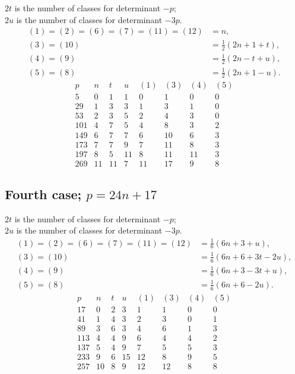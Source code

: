 \documentclass[12pt]{article}
\begin{document}
$2t$ is the number of classes for determinant $-p$;\\
$2u$ is the number of classes for determinant $-3p$.
\[
\begin{aligned}
(1)=(2)=(6)=(7)=(11)=(12)&=n,\\
(3)=(10)&=\frac12(2n+1+t),\\
(4)=(9)&=\frac12(2n-t+u),\\
(5)=(8)&=\frac12(2n+1-u).
\end{aligned}
\]
\[
\begin{array}{r|r|r|r|r|r|r|r}
p&n&t&u&(1)&(3)&(4)&(5)\\\hline
5&0&1&1&0&1&0&0\\
29&1&3&3&1&3&1&0\\
53&2&3&5&2&4&3&0\\
101&4&7&5&4&8&3&2\\
149&6&7&7&6&10&6&3\\
173&7&7&9&7&11&8&3\\
197&8&5&11&8&11&11&3\\
269&11&11&7&11&17&9&8
\end{array}
\]

\subsection*{Fourth case; \(p=24n+17\)}

$2t$ is the number of classes for determinant $-p$;\\
$2u$ is the number of classes for determinant $-3p$.
\[
\begin{aligned}
(1)=(2)=(6)=(7)=(11)=(12)&=\frac16(6n+3+u),\\
(3)=(10)&=\frac16(6n+6+3t-2u),\\
(4)=(9)&=\frac16(6n+3-3t+u),\\
(5)=(8)&=\frac16(6n+6-2u).
\end{aligned}
\]
\[
\begin{array}{r|r|r|r|r|r|r|r}
p&n&t&u&(1)&(3)&(4)&(5)\\\hline
17&0&2&3&1&1&0&0\\
41&1&4&3&2&3&0&1\\
89&3&6&3&4&6&1&3\\
113&4&4&9&6&4&4&2\\
137&5&4&9&7&5&5&3\\
233&9&6&15&12&8&9&5\\
257&10&8&9&12&12&8&8
\end{array}
\]
\end{document}
